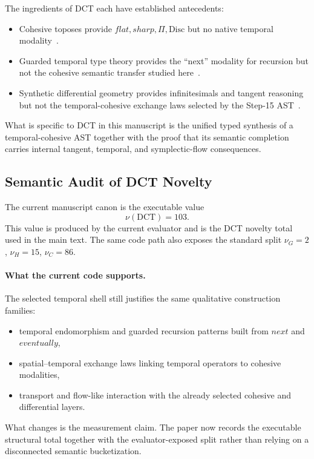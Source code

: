 \documentclass[11pt,a4paper]{article}
\def\flat{flat}%
\def\sharp{sharp}%
\def\bigcirc{next}%
\def\Diamond{eventually}%
\theoremstyle{plain}
\theoremstyle{definition}
\theoremstyle{remark}
\newcommand{\Disc}{\mathrm{Disc}}
\begin{document}
The ingredients of DCT each have established antecedents:
\begin{itemize}[nosep]
    \item Cohesive toposes provide $\flat,\sharp,\Pi,\Disc$ but no native temporal modality~\cite{lawvere,schreiber}.
    \item Guarded temporal type theory provides the ``next'' modality for recursion but not the cohesive semantic transfer studied here~\cite{nakano}.
    \item Synthetic differential geometry provides infinitesimals and tangent reasoning but not the temporal-cohesive exchange laws selected by the Step-15 AST~\cite{kock}.
\end{itemize}
What is specific to DCT in this manuscript is the unified typed synthesis of a temporal-cohesive AST together with the proof that its semantic completion carries internal tangent, temporal, and symplectic-flow consequences.

\subsection{Semantic Audit of DCT Novelty}
\label{tab:nu-audit}

The current manuscript canon is the executable value
\[
  \nu(\text{DCT}) = 103.
\]
This value is produced by the current evaluator and is the DCT novelty total used in the main text.
The same code path also exposes the standard split $\nu_G=2$, $\nu_H=15$, $\nu_C=86$.

\paragraph{What the current code supports.}
The selected temporal shell still justifies the same qualitative construction families:
\begin{itemize}[nosep]
    \item temporal endomorphism and guarded recursion patterns built from $\bigcirc$ and $\Diamond$,
    \item spatial--temporal exchange laws linking temporal operators to cohesive modalities,
    \item transport and flow-like interaction with the already selected cohesive and differential layers.
\end{itemize}
What changes is the measurement claim.
The paper now records the executable structural total together with the evaluator-exposed split rather than relying on a disconnected semantic bucketization.
\end{document}
